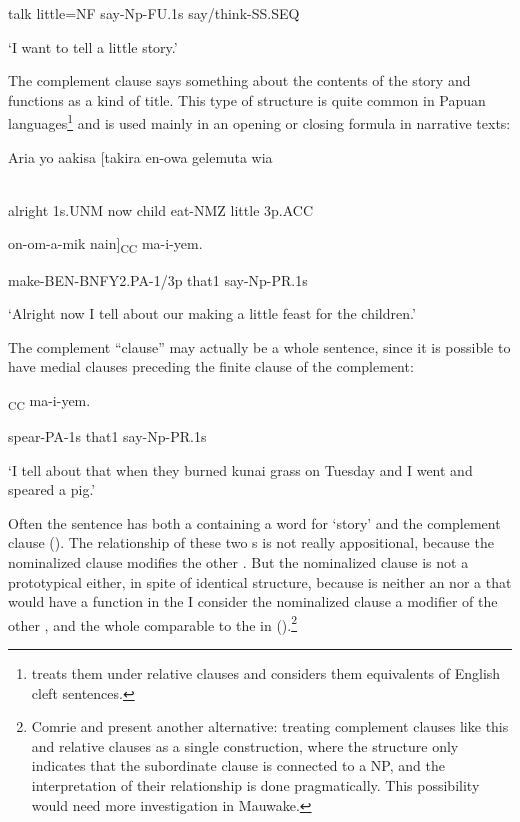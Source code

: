 talk  little=NF  say-Np-FU.1s  say/think-SS.SEQ

`I want to tell a little story.'

The complement clause says something about the contents of the story and functions as a kind of title. This type of structure is quite common in Papuan languages\footnote{\citet[231]{Reesink1987} treats them under relative clauses and considers them equivalents of English cleft sentences.} and is used mainly in an opening or closing formula in narrative texts: 

\ea%
\label{ex:x1596}
\gll Aria  yo  aakisa  [takira  en-owa  gelemuta  wia  \\
      \\
\glt
\z

alright  1s.UNM  now  child  eat-NMZ  little  3p.ACC

on-om-a-mik  nain]\textsubscript{CC}  ma-i-yem.

make-BEN-BNFY2.PA-1/3p  that1  say-Np-PR.1s

`Alright now I tell about our making a little feast for the children.'

The complement ``clause'' may actually be a whole sentence, since it is possible to have medial clauses preceding the finite clause of the complement:

\ea%
\label{ex:x1597}
\gll [Tunde=pa  fikera  kuum-iwkin  ikiw-ep  waaya  \\
      \\
\glt
\z

Tuesday=LOC  kunai.grass  burn-2/3p.DS  go-SS.SEQ  pig

mik-a-m  nain]\textsubscript{CC}  ma-i-yem.

spear-PA-1s  that1  say-Np-PR.1s

`I tell about that when they burned kunai grass on Tuesday and I went and speared a pig.'

Often the sentence has both a  containing a word for `story' and the complement clause (). The relationship of these two s is not really appositional, because the nominalized clause modifies the other . But the nominalized clause is not a prototypical  either, in spite of identical structure, because  is neither an  nor a  that would have a function in the  I consider the nominalized clause a modifier of the other , and the whole comparable to the  in ().\footnote{Comrie and \citet{Horie1995} present another alternative: treating complement clauses like this and relative clauses as a single construction, where the structure only indicates that the subordinate clause is connected to a NP, and the interpretation of their relationship is done pragmatically. This possibility would need more investigation in Mauwake.} 

